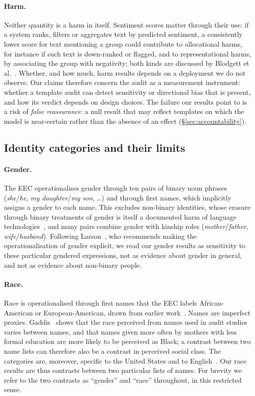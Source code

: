 \documentclass[runningheads]{llncs}
\begin{document}
\paragraph{Harm.} Neither quantity is a harm in itself. Sentiment scores matter
through their use: if a system ranks, filters or aggregates text by predicted
sentiment, a consistently lower score for text mentioning a group could
contribute to allocational harms, for instance if such text is down-ranked or
flagged, and to representational harms, by associating the group with
negativity; both kinds are discussed by Blodgett et al.~\cite{blodgett2020}. Whether, and how much, harm
results depends on a deployment we do not observe. Our claims therefore concern
the audit as a measurement instrument: whether a template audit can detect
sensitivity or directional bias that is present, and how its verdict depends on
design choices. The failure our results point to is a risk of \emph{false
reassurance}: a null result that may reflect templates on which the model is
near-certain rather than the absence of an effect (\S\ref{sec:accountability}).

\subsection{Identity categories and their limits}\label{sec:categories}
\paragraph{Gender.} The EEC operationalises gender through ten pairs of binary
noun phrases (\emph{she}/\emph{he}, \emph{my daughter}/\emph{my son}, \ldots)
and through first names, which implicitly assigns a gender to each name. This
excludes non-binary identities, whose erasure through binary treatments of
gender is itself a documented harm of language technologies~\cite{dev2021}, and
many pairs combine gender with kinship roles (\emph{mother}/\emph{father},
\emph{wife}/\emph{husband}). Following Larson~\cite{larson2017}, who recommends making
the operationalisation of gender explicit, we read our gender results as
sensitivity to these particular gendered expressions, not as evidence about
gender in general, and not as evidence about non-binary people.

\paragraph{Race.} Race is operationalised through first names that the EEC
labels African-American or European-American, drawn from earlier
work~\cite{caliskan2017,bertrand2004}. Names are imperfect proxies.
Gaddis~\cite{gaddis2017} shows that the race perceived from names used in audit studies
varies between names, and that names given more often by mothers with less
formal education are more likely to be perceived as Black; a contrast between
two name lists can therefore also be a contrast in perceived social class. The
categories are, moreover, specific to the United States and to
English~\cite{field2021}. Our race results are thus contrasts between two
particular lists of names. For brevity we refer to the two contrasts as
``gender'' and ``race'' throughout, in this restricted sense.
\end{document}

